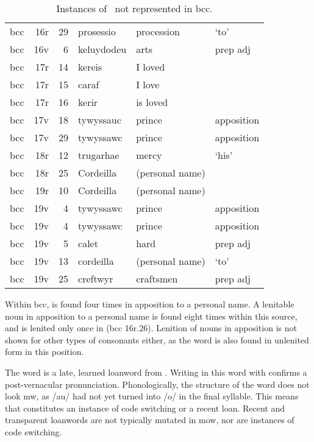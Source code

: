 \begin{table}[h]
  \centering
  \begin{tabular}{lddwql}
    \toprule
     &  &  &  &  &  \\
    \midrule
    \gls{bcc} & 16r & 29 & prosessio & procession &  ‘to' \\
    \gls{bcc} & 16v & 6 & keluydodeu & arts & prep adj \\
    \gls{bcc} & 17r & 14 & kereis & I loved &  \\
    \gls{bcc} & 17r & 15 & caraf & I love &  \\
    \gls{bcc} & 17r & 16 & kerir & is loved &  \\
    \gls{bcc} & 17v & 18 & tywyssauc & prince & apposition \\
    \gls{bcc} & 17v & 29 & tywyssawc & prince & apposition \\
    \gls{bcc} & 18r & 12 & trugarhae & mercy &  ‘his' \\
    \gls{bcc} & 18r & 25 & Cordeilla & (personal name) &  \\
    \gls{bcc} & 19r & 10 & Cordeilla & (personal name) &  \\
    \gls{bcc} & 19v & 4 & tywyssawc & prince & apposition \\
    \gls{bcc} & 19v & 4 & tywyssawc & prince & apposition \\
    \gls{bcc} & 19v & 5 & calet & hard & prep adj \\
    \gls{bcc} & 19v & 13 & cordeilla & (personal name) &  ‘to' \\
    \gls{bcc} & 19v & 25 & creftwyr & craftsmen & prep adj \\
    \bottomrule
  \end{tabular}%
  \caption{Instances of \lT\ not represented in \acrshort{bcc}.}
  \label{tab:ltnotrepbcc}
\end{table}

Within \gls{bcc},  is found four times in apposition to a personal name.
A lenitable noun in apposition to a personal name is found eight times within this source, and is lenited only once in  (\gls{bcc} 16r.26).
Lenition of nouns in apposition is not shown for other types of consonants either, as the word  is also found in unlenited form in this position.

The word  is a late, learned loanword from .
Writing  in this word with  confirms a post-vernacular pronunciation.
Phonologically, the structure of the word does not look \gls{mw}, as /au/ had not yet turned into /o/ in the final syllable.
This means that  constitutes an instance of code switching or a recent loan.
Recent and transparent loanwords are not typically mutated in \gls{mow}, nor are instances of code switching.

